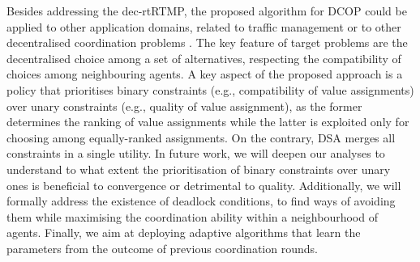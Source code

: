 Besides addressing the dec-rtRTMP, the proposed algorithm for DCOP could be applied to other application domains, related to traffic management or to other decentralised coordination problems \cite{9078053,10.5555/3535850.3535969,10.1613/jair.1.16997,picard:hal-03181968,YANG20214505}. The key feature of target problems are the decentralised choice among a set of alternatives, respecting the compatibility of choices among neighbouring agents. A key aspect of the proposed approach is a policy that prioritises binary constraints (e.g., compatibility of value assignments) over unary constraints (e.g., quality of value assignment), as the former determines the ranking of value assignments while the latter is exploited only for choosing among equally-ranked assignments. On the contrary, DSA merges all constraints in a single utility.
In future work, we will deepen our analyses to understand to what extent the prioritisation of binary constraints over unary ones is beneficial to convergence or detrimental to quality. Additionally, we will formally address the existence of deadlock conditions, to find ways of avoiding them while maximising the coordination ability within a neighbourhood of agents. Finally, we aim at deploying adaptive algorithms that learn the parameters from the outcome of previous coordination rounds.    